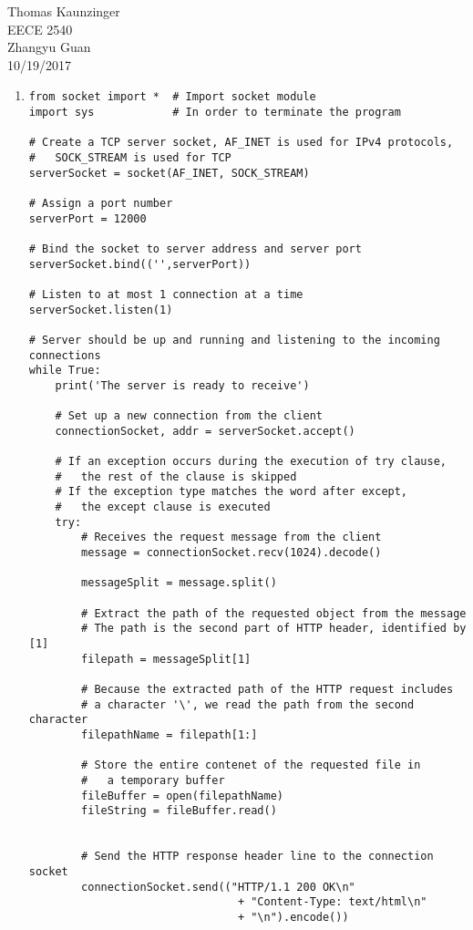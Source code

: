 \documentclass[12pt]{article}
\begin{document}
\noindent Thomas Kaunzinger\\
EECE 2540\\
Zhangyu Guan\\
10/19/2017\\
\begin{enumerate}
	\item \begin{verbatim}
from socket import *  # Import socket module
import sys            # In order to terminate the program

# Create a TCP server socket, AF_INET is used for IPv4 protocols,
# 	SOCK_STREAM is used for TCP
serverSocket = socket(AF_INET, SOCK_STREAM)

# Assign a port number
serverPort = 12000

# Bind the socket to server address and server port
serverSocket.bind(('',serverPort))

# Listen to at most 1 connection at a time
serverSocket.listen(1)

# Server should be up and running and listening to the incoming connections
while True:
    print('The server is ready to receive')

    # Set up a new connection from the client
    connectionSocket, addr = serverSocket.accept()

    # If an exception occurs during the execution of try clause,
    # 	the rest of the clause is skipped
    # If the exception type matches the word after except,
    # 	the except clause is executed
    try:
        # Receives the request message from the client
        message = connectionSocket.recv(1024).decode()

        messageSplit = message.split()

        # Extract the path of the requested object from the message
        # The path is the second part of HTTP header, identified by [1]
        filepath = messageSplit[1]

        # Because the extracted path of the HTTP request includes 
        # a character '\', we read the path from the second character 
        filepathName = filepath[1:]

        # Store the entire contenet of the requested file in
        # 	a temporary buffer
        fileBuffer = open(filepathName)
        fileString = fileBuffer.read()


        # Send the HTTP response header line to the connection socket
        connectionSocket.send(("HTTP/1.1 200 OK\n"
                                + "Content-Type: text/html\n"
                                + "\n").encode())


\end{verbatim}
\end{enumerate}
\end{document}
